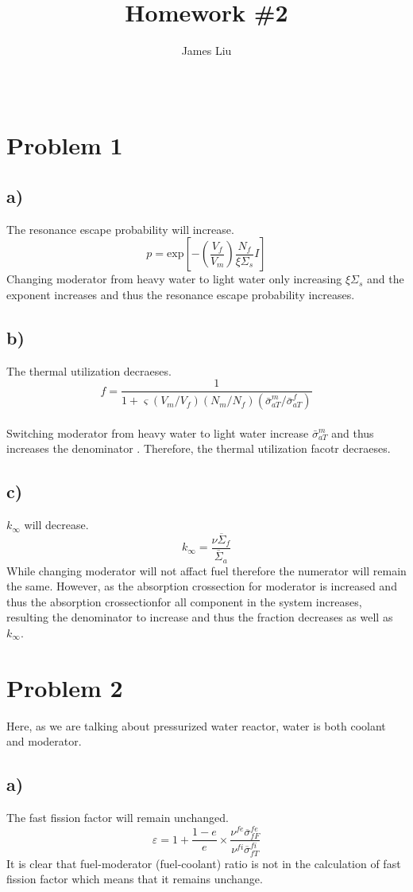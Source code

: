 \documentclass{article}
\title{\textbf{Homework \#2 }}
\author{James Liu}
\date{\ }
\begin{document}
\maketitle
\section*{Problem 1}
\subsection*{a)}

The resonance escape probability will increase.\\
\[p=\text{exp}\left[-\left(\frac{V_f}{V_m}\right)\frac{N_f}{\xi \Sigma_s}I\right]\]
Changing moderator from heavy water to light water only increasing \(\xi \Sigma_s\) and the exponent 
increases and thus the resonance escape probability increases.
\subsection*{b)}
The thermal utilization decraeses.\\
\[f = \frac{1}{1+\varsigma (V_m/V_f)(N_m/N_f)(\bar{\sigma}_{aT}^m/\bar{\sigma}_{aT}^f)}\]\\
Switching moderator from heavy water to light water increase \(\bar{\sigma}_{aT}^m\) and thus increases the denominator
. Therefore, the thermal utilization facotr decraeses.
\subsection*{c)}
\(k_\infty\) will decrease.\\
\[k_\infty = \frac{\nu \overline{\Sigma}_f}{\overline{\Sigma}_a}\]
While changing moderator will not affact fuel therefore the numerator will remain the same.
However, as the absorption crossection for moderator is increased and thus the absorption crossectionfor all 
component in the system increases, resulting the denominator to increase and thus the fraction decreases as well as 
\(k_\infty\).
\section*{Problem 2}
Here, as we are talking about pressurized water reactor, water is both coolant and moderator.
\subsection*{a)}
The fast fission factor will remain unchanged.\\
\[\varepsilon=1+\frac{1-e}{e}\times \frac{\nu^{fe}\overline{\sigma}_{fF}^{fe}}{\nu^{fi}\overline{\sigma}^{fi}_{fT}}\]
It is clear that fuel-moderator (fuel-coolant) ratio is not in the calculation of fast fission factor which means that it remains unchange.
\end{document}
